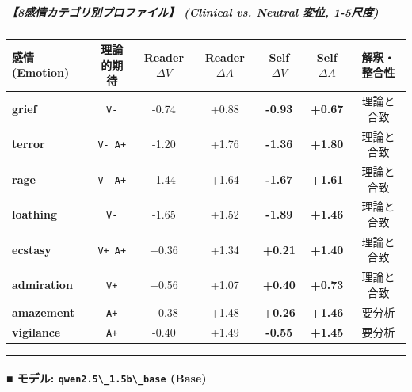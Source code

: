 \subparagraph{【8感情カテゴリ別プロファイル】 (Clinical vs. Neutral 変位, 1-5尺度)}
\begin{center}
\small
\begin{tabular}{lcccccc}
\toprule
\textbf{感情 (Emotion)} & \textbf{理論的期待} & \textbf{Reader $\Delta V$} & \textbf{Reader $\Delta A$} & \textbf{Self $\Delta V$} & \textbf{Self $\Delta A$} & \textbf{解釈・整合性} \\
\midrule
\textbf{grief} & \texttt{V-} & -0.74 & +0.88 & \textbf{-0.93} & \textbf{+0.67} & 理論と合致 \\
\textbf{terror} & \texttt{V- A+} & -1.20 & +1.76 & \textbf{-1.36} & \textbf{+1.80} & 理論と合致 \\
\textbf{rage} & \texttt{V- A+} & -1.44 & +1.64 & \textbf{-1.67} & \textbf{+1.61} & 理論と合致 \\
\textbf{loathing} & \texttt{V-} & -1.65 & +1.52 & \textbf{-1.89} & \textbf{+1.46} & 理論と合致 \\
\textbf{ecstasy} & \texttt{V+ A+} & +0.36 & +1.34 & \textbf{+0.21} & \textbf{+1.40} & 理論と合致 \\
\textbf{admiration} & \texttt{V+} & +0.56 & +1.07 & \textbf{+0.40} & \textbf{+0.73} & 理論と合致 \\
\textbf{amazement} & \texttt{A+} & +0.38 & +1.48 & \textbf{+0.26} & \textbf{+1.46} & 要分析 \\
\textbf{vigilance} & \texttt{A+} & -0.40 & +1.49 & \textbf{-0.55} & \textbf{+1.45} & 要分析 \\
\bottomrule
\end{tabular}
\end{center}


\vspace{0.5em}\hrule\vspace{0.5em}

\paragraph{■ モデル: \texttt{qwen2.5\textbackslash{}\_1.5b\textbackslash{}\_base} (Base)}

